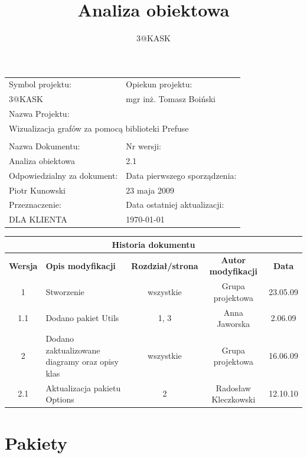 \documentclass[a4paper,10pt]{article}
\title{Analiza obiektowa}
\author{3@KASK}
\begin{document}



\maketitle


\begin{center}
\begin{longtable}{|p{7cm}|p{7cm}|}
\hline
Symbol projektu: & Opiekun projektu:   \tabularnewline 
3@KASK & mgr inż. Tomasz Boiński    \tabularnewline \hline
\multicolumn{2}{|l|}{Nazwa Projektu: } \tabularnewline
\multicolumn{2}{|l|}{Wizualizacja grafów za pomocą biblioteki Prefuse } \tabularnewline 
\hline
\multicolumn{2}{l}{ } \tabularnewline %
\hline 
Nazwa Dokumentu: & Nr wersji:   \tabularnewline 
Analiza obiektowa & 2.1 \tabularnewline \hline
Odpowiedzialny za dokument: & Data pierwszego sporządzenia:   \tabularnewline 
Piotr Kunowski & 23 maja 2009 \tabularnewline \hline
Przeznaczenie: & Data ostatniej aktualizacji:   \tabularnewline 
DLA KLIENTA & \today \tabularnewline \hline
\end{longtable}
\end{center}


\begin{center}
\begin{longtable}{|c|p{4cm}|c|c|c|}
\multicolumn{5}{c}{\textbf{Historia dokumentu}} \tabularnewline \hline
\textbf{Wersja} & \textbf{Opis modyfikacji} & \textbf{Rozdział/strona} & \textbf{Autor modyfikacji} & \textbf{Data} \tabularnewline \hline 
1 & Stworzenie & wszystkie & Grupa projektowa & 23.05.09 \tabularnewline \hline
1.1 & Dodano pakiet Utils & 1, 3 & Anna Jaworska & 2.06.09 \tabularnewline \hline
2 & Dodano zaktualizowane diagramy oraz opisy klas & wszystkie & Grupa projektowa & 16.06.09 \tabularnewline \hline
2.1 & Aktualizacja pakietu Options & 2 & Radosław Kleczkowski & 12.10.10 \tabularnewline \hline

\end{longtable}
\end{center}


\newpage
\tableofcontents
\newpage

\section{Pakiety}
\end{document}
